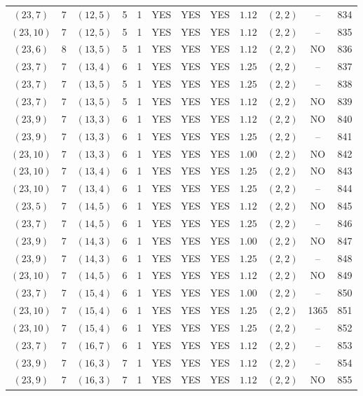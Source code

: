 \begin{longtable}{|c|c|c|c|c|c|c|c|c|c|c|c|}
$(23,7)$ & 7 & $(12,5)$ & 5 & 1 & YES & YES & YES & $1.12$ & $(2,2)$ & -- & 834\\
$(23,10)$ & 7 & $(12,5)$ & 5 & 1 & YES & YES & YES & $1.12$ & $(2,2)$ & -- & 835\\
$(23,6)$ & 8 & $(13,5)$ & 5 & 1 & YES & YES & YES & $1.12$ & $(2,2)$ & NO & 836\\
$(23,7)$ & 7 & $(13,4)$ & 6 & 1 & YES & YES & YES & $1.25$ & $(2,2)$ & -- & 837\\
$(23,7)$ & 7 & $(13,5)$ & 5 & 1 & YES & YES & YES & $1.25$ & $(2,2)$ & -- & 838\\
$(23,7)$ & 7 & $(13,5)$ & 5 & 1 & YES & YES & YES & $1.12$ & $(2,2)$ & NO & 839\\
$(23,9)$ & 7 & $(13,3)$ & 6 & 1 & YES & YES & YES & $1.12$ & $(2,2)$ & NO & 840\\
$(23,9)$ & 7 & $(13,3)$ & 6 & 1 & YES & YES & YES & $1.25$ & $(2,2)$ & -- & 841\\
$(23,10)$ & 7 & $(13,3)$ & 6 & 1 & YES & YES & YES & $1.00$ & $(2,2)$ & NO & 842\\
$(23,10)$ & 7 & $(13,4)$ & 6 & 1 & YES & YES & YES & $1.25$ & $(2,2)$ & NO & 843\\
$(23,10)$ & 7 & $(13,4)$ & 6 & 1 & YES & YES & YES & $1.25$ & $(2,2)$ & -- & 844\\
$(23,5)$ & 7 & $(14,5)$ & 6 & 1 & YES & YES & YES & $1.12$ & $(2,2)$ & NO & 845\\
$(23,7)$ & 7 & $(14,5)$ & 6 & 1 & YES & YES & YES & $1.25$ & $(2,2)$ & -- & 846\\
$(23,9)$ & 7 & $(14,3)$ & 6 & 1 & YES & YES & YES & $1.00$ & $(2,2)$ & NO & 847\\
$(23,9)$ & 7 & $(14,3)$ & 6 & 1 & YES & YES & YES & $1.25$ & $(2,2)$ & -- & 848\\
$(23,10)$ & 7 & $(14,5)$ & 6 & 1 & YES & YES & YES & $1.12$ & $(2,2)$ & NO & 849\\
$(23,7)$ & 7 & $(15,4)$ & 6 & 1 & YES & YES & YES & $1.00$ & $(2,2)$ & -- & 850\\
$(23,10)$ & 7 & $(15,4)$ & 6 & 1 & YES & YES & YES & $1.25$ & $(2,2)$ & 1365 & 851\\
$(23,10)$ & 7 & $(15,4)$ & 6 & 1 & YES & YES & YES & $1.25$ & $(2,2)$ & -- & 852\\
$(23,7)$ & 7 & $(16,7)$ & 6 & 1 & YES & YES & YES & $1.12$ & $(2,2)$ & -- & 853\\
$(23,9)$ & 7 & $(16,3)$ & 7 & 1 & YES & YES & YES & $1.12$ & $(2,2)$ & -- & 854\\
$(23,9)$ & 7 & $(16,3)$ & 7 & 1 & YES & YES & YES & $1.12$ & $(2,2)$ & NO & 855\\

\end{longtable}
